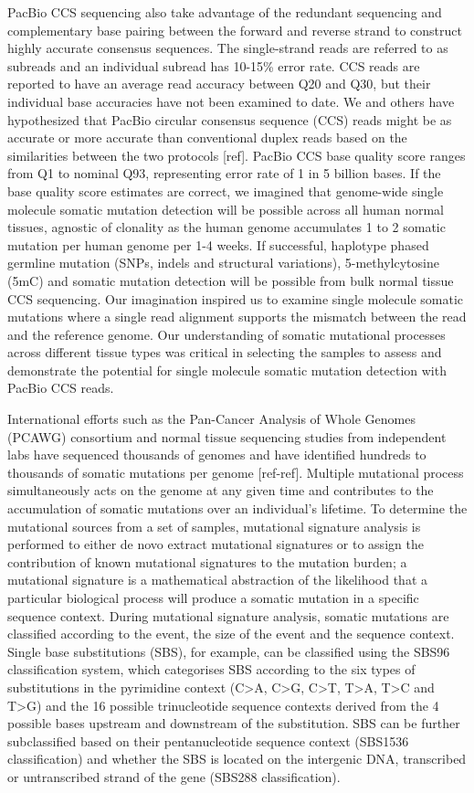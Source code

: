PacBio CCS sequencing also take advantage of the redundant sequencing and complementary base pairing between the forward and reverse strand to construct highly accurate consensus sequences. The single-strand reads are referred to as subreads and an individual subread has 10-15\% error rate. CCS reads are reported to have an average read accuracy between Q20 and Q30, but their individual base accuracies have not been examined to date. We and others have hypothesized that PacBio circular consensus sequence (CCS) reads might be as accurate or more accurate than conventional duplex reads based on the similarities between the two protocols [ref]. PacBio CCS base quality score ranges from Q1 to nominal Q93, representing error rate of 1 in 5 billion bases. If the base quality score estimates are correct, we imagined that genome-wide single molecule somatic mutation detection will be possible across all human normal tissues, agnostic of clonality as the human genome accumulates 1 to 2 somatic mutation per human genome per 1-4 weeks. If successful, haplotype phased germline mutation (SNPs, indels and structural variations), 5-methylcytosine (5mC) and somatic mutation detection will be possible from bulk normal tissue CCS sequencing. Our imagination inspired us to examine single molecule somatic mutations where a single read alignment supports the mismatch between the read and the reference genome. Our understanding of somatic mutational processes across different tissue types was critical in selecting the samples to assess and demonstrate the potential for single molecule somatic mutation detection with PacBio CCS reads. 

International efforts such as the Pan-Cancer Analysis of Whole Genomes (PCAWG) consortium and normal tissue sequencing studies from independent labs have sequenced thousands of genomes and have identified hundreds to thousands of somatic mutations per genome [ref-ref]. Multiple mutational process simultaneously acts on the genome at any given time and contributes to the accumulation of somatic mutations over an individual’s lifetime. To determine the mutational sources from a set of samples, mutational signature analysis is performed to either de novo extract mutational signatures or to assign the contribution of known mutational signatures to the mutation burden; a mutational signature is a mathematical abstraction of the likelihood that a particular biological process will produce a somatic mutation in a specific sequence context. During mutational signature analysis, somatic mutations are classified according to the event, the size of the event and the sequence context. Single base substitutions (SBS), for example, can be classified using the SBS96 classification system, which categorises SBS according to the six types of substitutions in the pyrimidine context (C>A, C>G, C>T, T>A, T>C and T>G) and the 16 possible trinucleotide sequence contexts derived from the 4 possible bases upstream and downstream of the substitution. SBS can be further subclassified based on their pentanucleotide sequence context (SBS1536 classification) and whether the SBS is located on the intergenic DNA, transcribed or untranscribed strand of the gene (SBS288 classification). 

